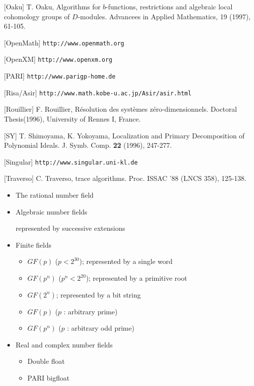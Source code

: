 \begin{slide}{}

[Oaku] T. Oaku, Algorithms for $b$-functions, restrictions and algebraic
local cohomology groups of $D$-modules.
Advancees in Applied Mathematics, 19 (1997), 61-105.

[OpenMath] {\tt http://www.openmath.org}

[OpenXM] {\tt http://www.openxm.org}

[PARI] {\tt http://www.parigp-home.de}

[Risa/Asir] {\tt http://www.math.kobe-u.ac.jp/Asir/asir.html}

[Rouillier] F. Rouillier,
R\'esolution des syst\`emes z\'ero-dimensionnels. 
Doctoral Thesis(1996), University of Rennes I, France.

[SY] T. Shimoyama, K. Yokoyama, Localization and Primary Decomposition of Polynomial Ideals.  J. Symb. Comp. {\bf 22} (1996), 247-277.

[Singular] {\tt http://www.singular.uni-kl.de}

[Traverso] C. Traverso, \gr trace algorithms. Proc. ISSAC '88 (LNCS 358), 125-138.

\end{slide}

\begin{slide}{}
\begin{center}
\end{center}
\end{slide}

\begin{slide}{}

\begin{itemize}
\item The rational number field
\item Algebraic number fields

represented by successive extensions
\item Finite fields
\begin{itemize}
\item $GF(p)$ ($p<2^{30}$); represented by a single word
\item $GF(p^n)$ ($p^n < 2^{20}$); represented by a primitive root
\item $GF(2^n)$; represented by a bit string
\item $GF(p)$ ($p$ : arbitrary prime)
\item $GF(p^n)$ ($p$ : arbitrary odd prime)
\end{itemize}

\item Real and complex number fields

\begin{itemize}
\item Double float
\item PARI bigfloat
\end{itemize}

\end{itemize}
\end{slide}

